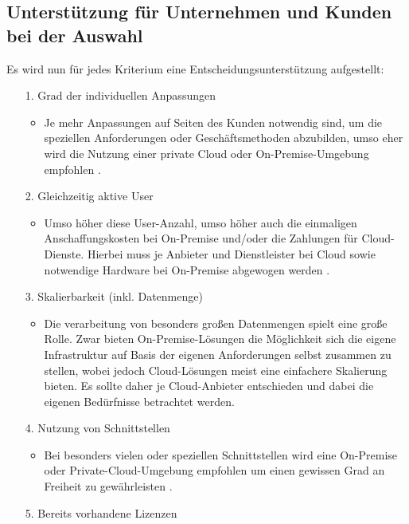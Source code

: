 \documentclass[12pt,bibtotoc]{article}
\begin{document}
		\subsection{Unterstützung für Unternehmen und Kunden bei der Auswahl}
		Es wird nun für jedes Kriterium eine Entscheidungsunterstützung aufgestellt:
		\begin{itemize}
			\item[1.] Grad der individuellen Anpassungen
			\begin{itemize}
				\item Je mehr Anpassungen auf Seiten des Kunden notwendig sind, um die speziellen Anforderungen oder Geschäftsmethoden abzubilden, umso eher wird die Nutzung einer private Cloud oder On-Premise-Umgebung empfohlen \cite{Anhang}.
			\end{itemize}
			\item[2.] Gleichzeitig aktive User
				\begin{itemize}
					\item  Umso höher diese User-Anzahl, umso höher auch die einmaligen Anschaffungskosten bei On-Premise und/oder die Zahlungen für Cloud-Dienste. Hierbei muss je Anbieter und Dienstleister bei Cloud sowie notwendige Hardware bei On-Premise abgewogen werden \cite{Murugesan.2016}.
				\end{itemize}
			\item[3.] Skalierbarkeit (inkl. Datenmenge)
				\begin{itemize}
					\item Die verarbeitung von besonders großen Datenmengen spielt eine große Rolle. Zwar bieten On-Premise-Lösungen die Möglichkeit sich die eigene Infrastruktur auf Basis der eigenen Anforderungen selbst zusammen zu stellen, wobei jedoch Cloud-Lösungen meist eine einfachere Skalierung bieten. Es sollte daher je Cloud-Anbieter entschieden und dabei die eigenen Bedürfnisse betrachtet werden.
				\end{itemize}
			\item[4.] Nutzung von Schnittstellen
				\begin{itemize}
					\item Bei besonders vielen oder speziellen Schnittstellen wird eine On-Premise oder Private-Cloud-Umgebung empfohlen um einen gewissen Grad an Freiheit zu gewährleisten \cite{Anhang}.
				\end{itemize}
			\item[5.] Bereits vorhandene Lizenzen

\end{itemize}
\end{document}
